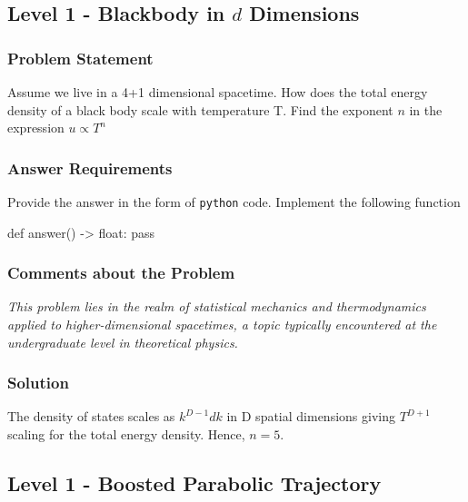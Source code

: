 \vspace{2cm}





\subsection{Level 1 - Blackbody in $d$ Dimensions} 


\subsubsection*{Problem Statement}
Assume we live in a 4+1 dimensional spacetime. How does the total energy density of a black body scale with temperature T. Find the exponent $n$ in the expression $u \propto T^{n}$

\subsubsection*{Answer Requirements}
Provide the answer in the form of \texttt{python} code. Implement the following function
\begin{python}
def answer() -> float:
    pass
\end{python}


\subsubsection*{Comments about the Problem}
\textit{This problem lies in the realm of statistical mechanics and thermodynamics applied to higher-dimensional spacetimes, a topic typically encountered at the undergraduate level in theoretical physics.}

\subsubsection*{Solution}
The density of states scales as $k^{D-1}dk$ in D spatial dimensions giving 
$T^{D+1}$ scaling for the total energy density. Hence, $\boxed{n=5}.$



\vspace{2cm}





\subsection{Level 1 - Boosted Parabolic Trajectory}

